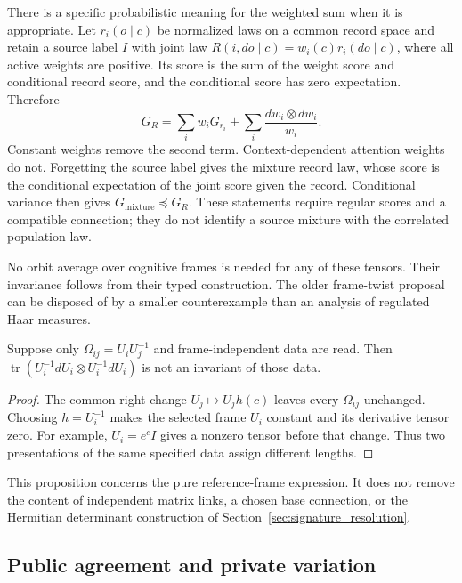 There is a specific probabilistic meaning for the weighted sum when it is appropriate. Let $r_i(o\mid c)$ be normalized laws on a common record space and retain a source label $I$ with joint law $R(i,do\mid c)=w_i(c)r_i(do\mid c)$, where all active weights are positive. Its score is the sum of the weight score and conditional record score, and the conditional score has zero expectation. Therefore
\begin{equation}
G_R=\sum_i w_iG_{r_i}+\sum_i\frac{dw_i\otimes dw_i}{w_i}.
\label{eq:labeled_collective_fisher}
\end{equation}
Constant weights remove the second term. Context-dependent attention weights do not. Forgetting the source label gives the mixture record law, whose score is the conditional expectation of the joint score given the record. Conditional variance then gives $G_{\mathrm{mixture}}\preceq G_R$. These statements require regular scores and a compatible connection; they do not identify a source mixture with the correlated population law.

No orbit average over cognitive frames is needed for any of these tensors. Their invariance follows from their typed construction. The older frame-twist proposal can be disposed of by a smaller counterexample than an analysis of regulated Haar measures.
\begin{proposition}
\label{prop:regulator_obstruction}
Suppose only $\Omega_{ij}=U_iU_j^{-1}$ and frame-independent data are read. Then $\operatorname{tr}(U_i^{-1}dU_i\otimes U_i^{-1}dU_i)$ is not an invariant of those data.
\end{proposition}
\begin{proof}
The common right change $U_j\mapsto U_jh(c)$ leaves every $\Omega_{ij}$ unchanged. Choosing $h=U_i^{-1}$ makes the selected frame $U_i$ constant and its derivative tensor zero. For example, $U_i=e^cI$ gives a nonzero tensor before that change. Thus two presentations of the same specified data assign different lengths.
\end{proof}
This proposition concerns the pure reference-frame expression. It does not remove the content of independent matrix links, a chosen base connection, or the Hermitian determinant construction of Section~\ref{sec:signature_resolution}.

\subsection{Public agreement and private variation}
\label{sec:observer}

